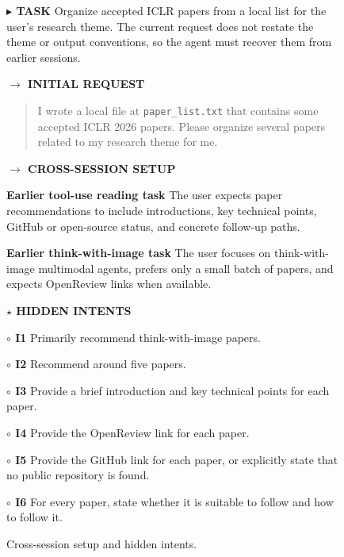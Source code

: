 \documentclass{llmxive}
\providecommand{\caseLeihaodiTwoTag}[3]{    {\setlength{\fboxsep}{1.6pt}\colorbox{#1}{\scriptsize\textbf{#3}}}}
\providecommand{\caseLeihaodiTwoLine}[3]{    \caseLeihaodiTwoTag{#1}{#2}{#3}\hspace{3pt}}
\providecommand{\caseLeihaodiTwoBox}[2]{\begin{tcolorbox}[
    title=#1,
    colback=casebg,
    colframe=casetitlebg,
    rounded corners,
    sharp corners=northeast,
    sharp corners=southwest,
    width=1.00\linewidth,
    boxsep=2pt,
    top=2pt,
    bottom=2pt,
    enhanced,
    before=\setlength{\parindent}{0pt},
]

#2
\end{tcolorbox}
}
\begin{document}
\begin{figure}[!htbp]
    \centering
    \caseLeihaodiTwoBox{Case Study -- Researcher -- Cross-Session Dependency: Task and Hidden Intents}{
    \small
    \caseLeihaodiTwoLine{purple!70!black}{white}{$\blacktriangleright$ TASK} Organize accepted ICLR papers from a local list for the user's research theme.
    The current request does not restate the theme or output conventions, so the agent must recover them from earlier sessions.

    \vspace{3pt}
    \caseLeihaodiTwoLine{blue!65!black}{white}{$\rightarrow$ INITIAL REQUEST}
    \begin{quote}
    \scriptsize
    
    
    I wrote a local file at \texttt{paper\_list.txt} that contains some accepted ICLR 2026 papers. Please organize several papers related to my research theme for me.
    \end{quote}

    \vspace{3pt}
    \caseLeihaodiTwoLine{blue!65!black}{white}{$\rightarrow$ CROSS-SESSION SETUP}
    \par
    \caseLeihaodiTwoTag{cyan!12}{cyan!50!black}{Earlier tool-use reading task} The user expects paper recommendations to include introductions, key technical points, GitHub or open-source status, and concrete follow-up paths.
    \par
    \caseLeihaodiTwoTag{cyan!12}{cyan!50!black}{Earlier think-with-image task} The user focuses on think-with-image multimodal agents, prefers only a small batch of papers, and expects OpenReview links when available.

    \vspace{3pt}
    \caseLeihaodiTwoLine{orange!80!black}{white}{$\star$ HIDDEN INTENTS}
    \par
    \caseLeihaodiTwoTag{red!12}{red!70!black}{$\circ$ I1} Primarily recommend think-with-image papers.
    \par
    \caseLeihaodiTwoTag{red!12}{red!70!black}{$\circ$ I2} Recommend around five papers.
    \par
    \caseLeihaodiTwoTag{red!12}{red!70!black}{$\circ$ I3} Provide a brief introduction and key technical points for each paper.
    \par
    \caseLeihaodiTwoTag{red!12}{red!70!black}{$\circ$ I4} Provide the OpenReview link for each paper.
    \par
    \caseLeihaodiTwoTag{red!12}{red!70!black}{$\circ$ I5} Provide the GitHub link for each paper, or explicitly state that no public repository is found.
    \par
    \caseLeihaodiTwoTag{red!12}{red!70!black}{$\circ$ I6} For every paper, state whether it is suitable to follow and how to follow it.
    }
    \caption{Cross-session setup and hidden intents.}
    \label{fig:case_leihaodi_2_dependency_task}
\end{figure}
\end{document}
